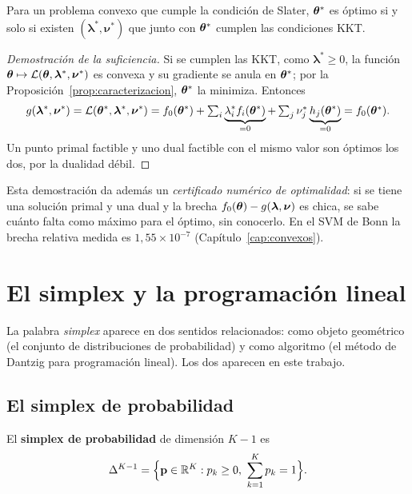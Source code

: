 \begin{teorema}
\label{teo:kkt}
Para un problema convexo que cumple la condición de Slater, $\boldsymbol{\theta}^*$ es óptimo si y solo si existen
$(\boldsymbol\lambda^*, \boldsymbol\nu^*)$ que junto con $\boldsymbol{\theta}^*$ cumplen las condiciones KKT.
\end{teorema}
\begin{proof}[Demostración de la suficiencia]
Si se cumplen las KKT, como $\boldsymbol\lambda^* \ge 0$, la función $\boldsymbol{\theta} \mapsto \mathcal{L}(\boldsymbol{\theta}, \boldsymbol\lambda^*, \boldsymbol\nu^*)$
es convexa y su gradiente se anula en $\boldsymbol{\theta}^*$; por la Proposición~\ref{prop:caracterizacion}, $\boldsymbol{\theta}^*$ la
minimiza. Entonces
\[
  g(\boldsymbol\lambda^*, \boldsymbol\nu^*) = \mathcal{L}(\boldsymbol{\theta}^*, \boldsymbol\lambda^*, \boldsymbol\nu^*)
  = f_0(\boldsymbol{\theta}^*) + \textstyle\sum_i \underbrace{\lambda_i^* f_i(\boldsymbol{\theta}^*)}_{=0} + \sum_j \nu_j^* \underbrace{h_j(\boldsymbol{\theta}^*)}_{=0}
  = f_0(\boldsymbol{\theta}^*).
\]
Un punto primal factible y uno dual factible con el mismo valor son óptimos los dos, por la dualidad débil.
\end{proof}

Esta demostración da además un \emph{certificado numérico de optimalidad}: si se tiene una solución primal y
una dual y la brecha $f_0(\boldsymbol{\theta}) - g(\boldsymbol\lambda, \boldsymbol\nu)$ es chica, se sabe cuánto falta como máximo
para el óptimo, sin conocerlo. En el SVM de Bonn la brecha relativa medida es $1{,}55\times10^{-7}$
(Capítulo~\ref{cap:convexos}).

\section{El simplex y la programación lineal}
\label{sec:simplex}

La palabra \emph{simplex} aparece en dos sentidos relacionados: como objeto geométrico (el conjunto de
distribuciones de probabilidad) y como algoritmo (el método de Dantzig para programación lineal). Los dos
aparecen en este trabajo.

\subsection{El simplex de probabilidad}

\begin{definicion}
El \textbf{simplex de probabilidad} de dimensión $K-1$ es
\begin{equation}
  \Delta^{K-1} = \Big\{\mathbf{p} \in \mathbb{R}^K : p_k \ge 0,\ \sum_{k=1}^{K} p_k = 1\Big\}.
\end{equation}
\end{definicion}

